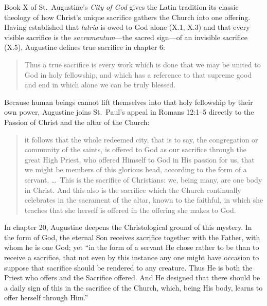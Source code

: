 Book X of St.\ Augustine's \emph{City of God} gives the Latin tradition its classic theology of how Christ's unique sacrifice gathers the Church into one offering. Having established that \emph{latria} is owed to God alone (X.1, X.3) and that every visible sacrifice is the \emph{sacramentum}---the sacred sign---of an invisible sacrifice (X.5), Augustine defines true sacrifice in chapter 6:

\begin{quote}
Thus a true sacrifice is every work which is done that we may be united to God in holy fellowship, and which has a reference to that supreme good and end in which alone we can be truly blessed.
\end{quote}

Because human beings cannot lift themselves into that holy fellowship by their own power, Augustine joins St.\ Paul's appeal in Romans 12:1--5 directly to the Passion of Christ and the altar of the Church:

\begin{quote}
it follows that the whole redeemed city, that is to say, the congregation or community of the saints, is offered to God as our sacrifice through the great High Priest, who offered Himself to God in His passion for us, that we might be members of this glorious head, according to the form of a servant. \dots\ This is the sacrifice of Christians: we, being many, are one body in Christ. And this also is the sacrifice which the Church continually celebrates in the sacrament of the altar, known to the faithful, in which she teaches that she herself is offered in the offering she makes to God.
\end{quote}

In chapter 20, Augustine deepens the Christological ground of this mystery. In the form of God, the eternal Son receives sacrifice together with the Father, with whom he is one God; yet ``in the form of a servant He chose rather to be than to receive a sacrifice, that not even by this instance any one might have occasion to suppose that sacrifice should be rendered to any creature. Thus He is both the Priest who offers and the Sacrifice offered. And He designed that there should be a daily sign of this in the sacrifice of the Church, which, being His body, learns to offer herself through Him.''

